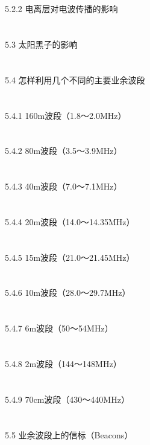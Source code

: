 \documentclass[12pt,UTF8]{ctexbook}
\begin{document}
\section{}5.2.2 电离层对电波传播的影响
\section{}5.3 太阳黑子的影响
\section{}5.4 怎样利用几个不同的主要业余波段
\section{}5.4.1 160m波段（1.8～2.0MHz）
\section{}5.4.2 80m波段（3.5～3.9MHz）
\section{}5.4.3 40m波段（7.0～7.1MHz）
\section{}5.4.4 20m波段（14.0～14.35MHz）
\section{}5.4.5 15m波段（21.0～21.45MHz）
\section{}5.4.6 10m波段（28.0～29.7MHz）
\section{}5.4.7 6m波段（50～54MHz）
\section{}5.4.8 2m波段（144～148MHz）
\section{}5.4.9 70cm波段（430～440MHz）
\section{}5.5 业余波段上的信标（Beacons）
\end{document}
